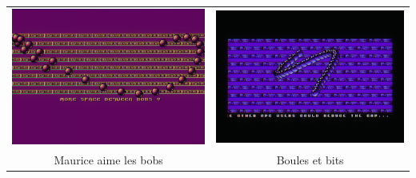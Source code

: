 \documentclass{beamer}
\begin{document}
\begin{frame}
\begin{columns}
\begin{column}{.62\linewidth}
{\begin{tabular}{@{}cc@{}}
	  \includegraphics[width=0.45\linewidth]{imgs/demo_maurice} &
	  \includegraphics[width=0.45\linewidth]{imgs/demo_boule}
	  \\

	  Maurice aime les bobs  & Boules et bits \\

	\end{tabular}

	}


\end{column}
\end{columns}
\end{frame}
\end{document}
